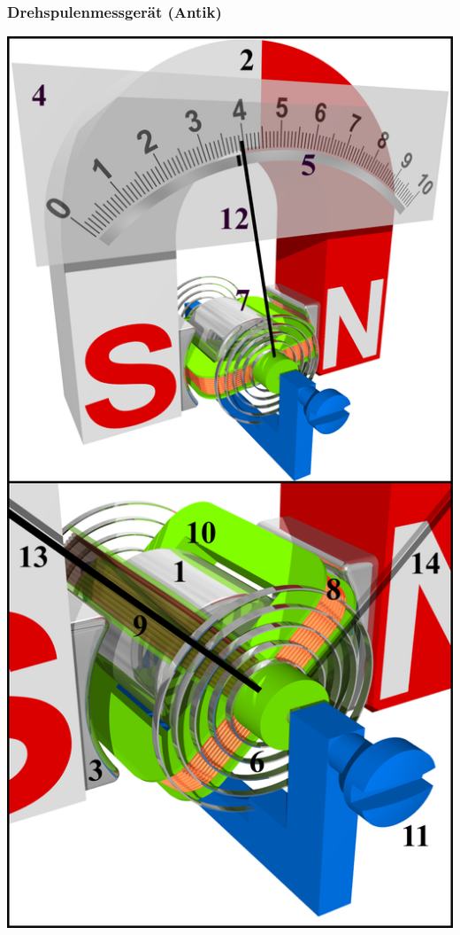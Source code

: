 \begin{frame}
    \frametitle{Drehspulenmessgerät (Antik)}
	\begin{minipage}{0.4\textwidth}
	    \includegraphics[width=.95\textwidth]{a16/drehspulenMess.png}
	\end{minipage}
		\hspace{0.5cm}
	\begin{minipage}{0.4\textwidth}	

\end{minipage}
\end{frame}
